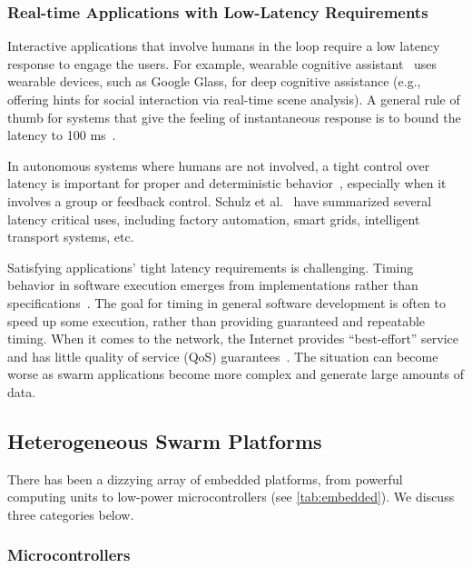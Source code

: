 \subsubsection{Real-time Applications with Low-Latency Requirements}
\label{sec:inter-low-latency}

Interactive applications that involve humans in the loop require a low latency
response to engage the users. For example, wearable cognitive
assistant~\cite{chen2018application} uses wearable devices, such as Google
Glass, for deep cognitive assistance (e.g., offering hints for social
interaction via real-time scene analysis). A general rule of thumb for systems
that give the feeling of instantaneous response is to bound the latency to 100
ms~\cite{miller1968response, nielsen1994usability}.

In autonomous systems where humans are not involved, a tight control over
latency is important for proper and deterministic
behavior~\cite{eidson2012distributed}, especially when it involves a group or
feedback control. Schulz et al.~\cite{schulz2017latency} have summarized several
latency critical uses, including factory automation, smart grids, intelligent
transport systems, etc.

Satisfying applications' tight latency requirements is challenging. Timing
behavior in software execution emerges from implementations rather than
specifications~\cite{lee2018real}. The goal for timing in general software
development is often to speed up some execution, rather than providing
guaranteed and repeatable timing. When it comes to the network, the Internet
provides ``best-effort'' service and has little quality of service (QoS)
guarantees~\cite{shenker1995fundamental}. The situation can become worse as
swarm applications become more complex and generate large amounts of data.

\subsection{Heterogeneous Swarm Platforms}
\label{sec:swarm-platforms}

There has been a dizzying array of embedded platforms, from powerful computing
units to low-power microcontrollers (see \autoref{tab:embedded}). We discuss
three categories below.

\subsubsection{Microcontrollers}

